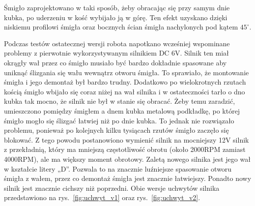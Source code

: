 Śmigło zaprojektowano w taki sposób, żeby obracając się przy samym dnie kubka, po uderzeniu w kość wybijało ją w górę. Ten efekt uzyskano
dzięki niskiemu profilowi śmigła oraz bocznych ścian śmigła nachylonych pod kątem $45^{\circ}$.

Podczas testów ostatecznej wersji robota napotkano wcześniej wspominane problemy z pierwotnie wykorzystywanym silnikiem DC 6V. Silnik ten miał okrągły wał przez co śmigło musiało
być bardzo dokładnie spasowane aby uniknąć ślizgania się wału wewnątrz otworu śmigła. To sprawiało, że montowanie śmigła i jego demontaż był bardzo trudny. Dodatkowo po wielokrotnych rzutach kością śmigło
wbijało się coraz niżej na wał silnika i w ostateczności tarło o dno kubka tak mocno, że silnik nie był w stanie się obracać. 
Żeby temu zaradzić, umieszczono pomiędzy śmigłem a dnem kubka metalową podkładkę, po której śmigło mogło się ślizgać łatwiej niż po dnie kubka. To
jednak nie rozwiązało problemu, ponieważ po kolejnych kilku tysiącach rzutów śmigło zaczęło się blokować. 
Z tego powodu postanowiono wymienić silnik na mocniejszy 12V silnik z przekładnią, który ma mniejszą częstotliwość obrotu (około 2000RPM zamiast 4000RPM), ale ma większy moment obrotowy.
Zaletą nowego silnika jest jego wał w kształcie litery „D”. Pozwala to na znacznie luźniejsze spasowanie otworu śmigła z wałem, przez co
demontaż śmigła jest znacznie łatwiejszy. Ponadto nowy silnik jest znacznie cichszy niż poprzedni. Obie wersje uchwytów silnika przedstawiono na rys.~\ref{fig:uchwyt_v1} oraz rys.~\ref{fig:uchwyt_v2}.

